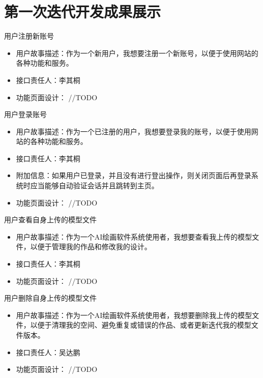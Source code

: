 \section{第一次迭代开发成果展示}
\begin{frame}{用户注册新账号}
    \begin{itemize}
        \item 用户故事描述：作为一个新用户，我想要注册一个新账号，以便于使用网站的各种功能和服务。
        \item 接口责任人：李其桐
        \item 功能页面设计： //TODO
    \end{itemize}
\end{frame}

\begin{frame}{用户登录账号}
    \begin{itemize}
        \item 用户故事描述：作为一个已注册的用户，我想要登录我的账号，以便于使用网站的各种功能和服务。
        \item 接口责任人：李其桐
        \item 附加信息：如果用户已登录，并且没有进行登出操作，则关闭页面后再登录系统时应当能够自动验证会话并且跳转到主页。
        \item 功能页面设计： //TODO
    \end{itemize}
\end{frame}

\begin{frame}{用户查看自身上传的模型文件}
    \begin{itemize}
        \item 用户故事描述：作为一个AI绘画软件系统使用者，我想要查看我上传的模型文件，以便于管理我的作品和修改我的设计。
        \item 接口责任人：李其桐
        \item 功能页面设计： //TODO
    \end{itemize}
\end{frame}

\begin{frame}{用户删除自身上传的模型文件}
    \begin{itemize}
        \item 用户故事描述：作为一个AI绘画软件系统使用者，我想要删除我上传的模型文件，以便于清理我的空间、避免重复或错误的作品、或者更新迭代我的模型文件版本。
        \item 接口责任人：吴达鹏
        \item 功能页面设计： //TODO
    \end{itemize}
\end{frame}

